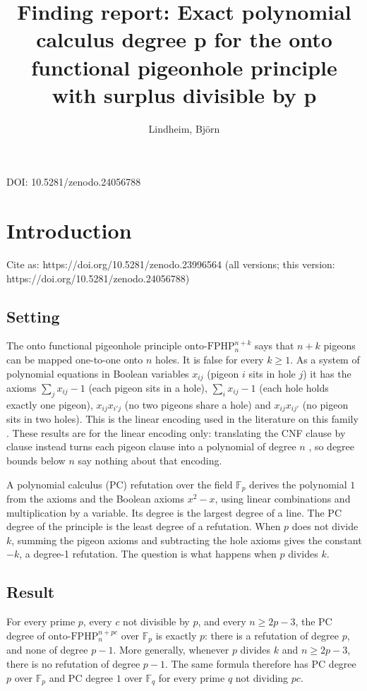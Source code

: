 \documentclass{article}
\title{Finding report: Exact polynomial calculus degree p for the onto functional pigeonhole principle with surplus divisible by p}
\author{Lindheim, Björn}
\date{}
\begin{document}
\maketitle
\begin{center}DOI: 10.5281/zenodo.24056788\end{center}
\section{Introduction}
\label{sec:exact-pc-degree-onto-fphp-first-level}

Cite as: https://doi.org/10.5281/zenodo.23996564 (all versions; this version: https://doi.org/10.5281/zenodo.24056788)

\subsection*{Setting}

The onto functional pigeonhole principle $\mathrm{onto\text{-}FPHP}^{n+k}_n$ says that $n+k$
pigeons can be mapped one-to-one onto $n$ holes. It is false for every $k\ge1$. As a system of
polynomial equations in Boolean variables $x_{ij}$ (pigeon $i$ sits in hole $j$) it has the
axioms $\sum_j x_{ij}-1$ (each pigeon sits in a hole), $\sum_i x_{ij}-1$ (each hole holds exactly
one pigeon), $x_{ij}x_{i'j}$ (no two pigeons share a hole) and $x_{ij}x_{ij'}$ (no pigeon sits in
two holes). This is the linear encoding used in the literature on this family
\cite{beame1998counting,razborov2001php}. These results are for the linear encoding only: translating the CNF clause by clause instead turns each pigeon clause into a polynomial of degree $n$ \cite{razborov2001php}, so degree bounds below $n$ say nothing about that encoding.

A polynomial calculus (PC) refutation over the field $\mathbb F_p$ derives the polynomial $1$
from the axioms and the Boolean axioms $x^2-x$, using linear combinations and multiplication by a
variable. Its degree is the largest degree of a line. The PC degree of the principle is the least
degree of a refutation. When $p$ does not divide $k$, summing the pigeon axioms and subtracting
the hole axioms gives the constant $-k$, a degree-1 refutation. The question is what happens when
$p$ divides $k$.

\subsection*{Result}

For every prime $p$, every $c$ not divisible by $p$, and every $n\ge 2p-3$, the PC degree of
$\mathrm{onto\text{-}FPHP}^{n+pc}_n$ over $\mathbb F_p$ is exactly $p$: there is a refutation of
degree $p$, and none of degree $p-1$. More generally, whenever $p$ divides $k$ and $n\ge2p-3$,
there is no refutation of degree $p-1$. The same formula therefore has PC degree $p$ over
$\mathbb F_p$ and PC degree $1$ over $\mathbb F_q$ for every prime $q$ not dividing $pc$.
\end{document}
